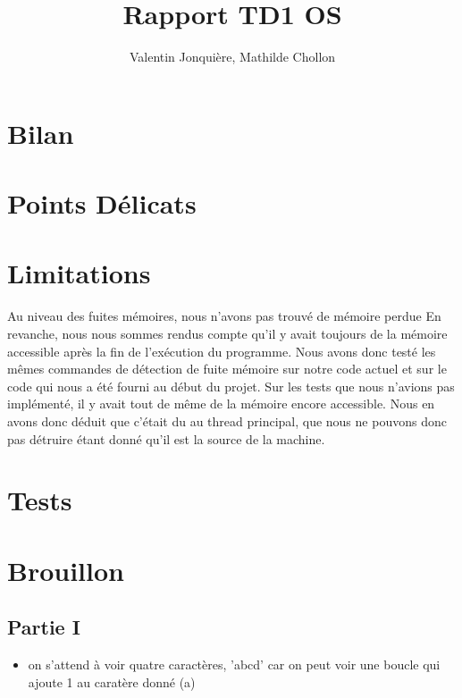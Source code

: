 \documentclass{article}
\author{
    Valentin Jonquière,
    Mathilde Chollon
}
\title{Rapport TD1 OS}
\begin{document}
\maketitle

\pagebreak

\tableofcontents

\pagebreak

\section{Bilan}


\section{Points Délicats}


\section{Limitations}
Au niveau des fuites mémoires, nous n'avons pas trouvé de mémoire perdue En revanche, nous nous sommes rendus compte qu'il y avait toujours de la mémoire accessible après la fin de l'exécution du programme.
Nous avons donc testé les mêmes commandes de détection de fuite mémoire sur notre code actuel et sur le code qui nous a été fourni au début du projet. Sur les tests que nous n'avions pas implémenté, il y avait tout de même
de la mémoire encore accessible. Nous en avons donc déduit que c'était du au thread principal, que nous ne pouvons donc pas détruire étant donné qu'il est la source de la machine.


\section{Tests}

\section{Brouillon}
\subsection{Partie I}
\begin{itemize}
    \item on s'attend à voir quatre caractères, 'abcd' car on peut voir une boucle qui ajoute 1 au caratère donné (a)

    
\end{itemize}
\end{document}
